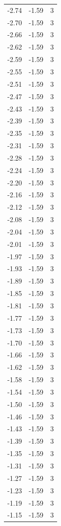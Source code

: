 \begin{longtable}{lrr}
  -2.74 & -1.59 & 3 \\
  -2.70 & -1.59 & 3 \\
  -2.66 & -1.59 & 3 \\
  -2.62 & -1.59 & 3 \\
  -2.59 & -1.59 & 3 \\
  -2.55 & -1.59 & 3 \\
  -2.51 & -1.59 & 3 \\
  -2.47 & -1.59 & 3 \\
  -2.43 & -1.59 & 3 \\
  -2.39 & -1.59 & 3 \\
  -2.35 & -1.59 & 3 \\
  -2.31 & -1.59 & 3 \\
  -2.28 & -1.59 & 3 \\
  -2.24 & -1.59 & 3 \\
  -2.20 & -1.59 & 3 \\
  -2.16 & -1.59 & 3 \\
  -2.12 & -1.59 & 3 \\
  -2.08 & -1.59 & 3 \\
  -2.04 & -1.59 & 3 \\
  -2.01 & -1.59 & 3 \\
  -1.97 & -1.59 & 3 \\
  -1.93 & -1.59 & 3 \\
  -1.89 & -1.59 & 3 \\
  -1.85 & -1.59 & 3 \\
  -1.81 & -1.59 & 3 \\
  -1.77 & -1.59 & 3 \\
  -1.73 & -1.59 & 3 \\
  -1.70 & -1.59 & 3 \\
  -1.66 & -1.59 & 3 \\
  -1.62 & -1.59 & 3 \\
  -1.58 & -1.59 & 3 \\
  -1.54 & -1.59 & 3 \\
  -1.50 & -1.59 & 3 \\
  -1.46 & -1.59 & 3 \\
  -1.43 & -1.59 & 3 \\
  -1.39 & -1.59 & 3 \\
  -1.35 & -1.59 & 3 \\
  -1.31 & -1.59 & 3 \\
  -1.27 & -1.59 & 3 \\
  -1.23 & -1.59 & 3 \\
  -1.19 & -1.59 & 3 \\
  -1.15 & -1.59 & 3 \\

\end{longtable}
